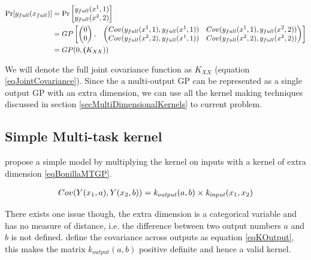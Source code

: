 \begin{equation}\label{eq:mogpJointPrior}
\begin{aligned}
       \Pr[y_{full}(x_{full})] & = \Pr\begin{bmatrix}   y_{full}(x^{1}, 1) \\ y_{full}(x^{2}, 2)   \end{bmatrix} \\
& = GP\begin{bmatrix}
   \begin{pmatrix}
   0\\ 
   0
   \end{pmatrix} ,& 
   \begin{pmatrix}
    Cov(y_{full}(x^{1}, 1), y_{full}(x^{1}, 1))  & Cov(y_{full}(x^{1}, 1), y_{full}(x^{2}, 2))\\ 
    Cov(y_{full}(x^{2}, 2), y_{full}(x^{1}, 1))     & Cov(y_{full}(x^{2}, 2), y_{full}(x^{2}, 2))
   \end{pmatrix}
   \end{bmatrix} \\
       & = GP(0, \bm{\mathit{(}}K_{XX}))
\end{aligned}
   \end{equation}

We will denote the full joint covariance function as $K_{XX}$ (equation \ref{eqJointCovariance}). Since the a multi-output GP can be represented as a single output GP with an extra dimension, we can use all the kernel making techniques discussed in section \ref{secMultiDimensionalKernels} to current problem. 

\subsection{Simple Multi-task kernel}\label{simpleMultiTask}
\cite{bonilla2007multi} propose a simple model by multiplying the kernel on inputs with a kernel of extra dimension \ref{eqBonillaMTGP}.

\begin{align}\label{eqBonillaMTGP}
    Cov(Y(x_{1}, a), Y(x_{2}, b)) = \mathit{k_{output}}(a, b) \times \mathit{k_{input}}(x_{1}, x_{2})
\end{align}

There exists one issue though, the extra dimension is a categorical variable and has no measure of distance, i.e. the difference between two output numbers $a$ and $b$ is not defined. \cite{bonilla2007multi} define the covariance across outputs as equation \ref{eqKOutput}, this makes the matrix $k_{output}(a, b)$ positive definite and hence a valid kernel.

